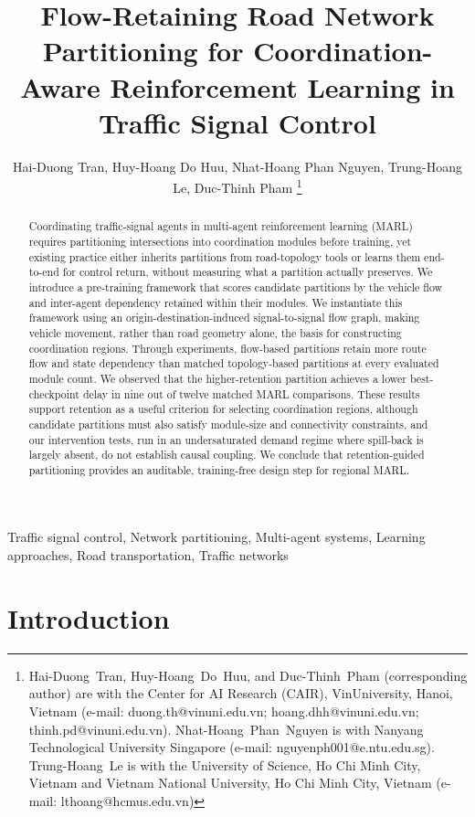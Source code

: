 \documentclass[journal]{IEEEtran}
\title{Flow-Retaining Road Network Partitioning for Coordination-Aware Reinforcement Learning in Traffic Signal Control}
\author{Hai-Duong Tran,
Huy-Hoang Do Huu,
Nhat-Hoang Phan Nguyen,
Trung-Hoang Le,
Duc-Thinh Pham
\thanks{Hai-Duong~Tran, Huy-Hoang~Do~Huu, and Duc-Thinh~Pham (corresponding author) are with the Center for AI Research (CAIR), VinUniversity, Hanoi, Vietnam (e-mail: duong.th@vinuni.edu.vn; hoang.dhh@vinuni.edu.vn; thinh.pd@vinuni.edu.vn). Nhat-Hoang~Phan~Nguyen is with Nanyang Technological University Singapore (e-mail: nguyenph001@e.ntu.edu.sg). Trung-Hoang~Le is with the University of Science, Ho Chi Minh City, Vietnam and Vietnam National University, Ho Chi Minh City, Vietnam (e-mail: lthoang@hcmus.edu.vn)}
}
\theoremstyle{definition}
\begin{document}
\maketitle

\begin{abstract}
    Coordinating traffic-signal agents in multi-agent reinforcement learning (MARL) requires partitioning intersections into coordination modules before training, yet existing practice either inherits partitions from road-topology tools or learns them end-to-end for control return, without measuring what a partition actually preserves. We introduce a pre-training framework that scores candidate partitions by the vehicle flow and inter-agent dependency retained within their modules. We instantiate this framework using an origin-destination-induced signal-to-signal flow graph, making vehicle movement, rather than road geometry alone, the basis for constructing coordination regions. Through experiments, flow-based partitions retain more route flow and state dependency than matched topology-based partitions at every evaluated module count. We observed that the higher-retention partition achieves a lower best-checkpoint delay in nine out of twelve matched MARL comparisons. These results support retention as a useful criterion for selecting coordination regions, although candidate partitions must also satisfy module-size and connectivity constraints, and our intervention tests, run in an undersaturated demand regime where spill-back is largely absent, do not establish causal coupling. We conclude that retention-guided partitioning provides an auditable, training-free design step for regional MARL.
\end{abstract}

\begin{IEEEkeywords}
    Traffic signal control, Network partitioning, Multi-agent systems,
    Learning approaches,
    Road transportation, Traffic networks
\end{IEEEkeywords}

\section{Introduction}
\label{sec:intro}
\end{document}

